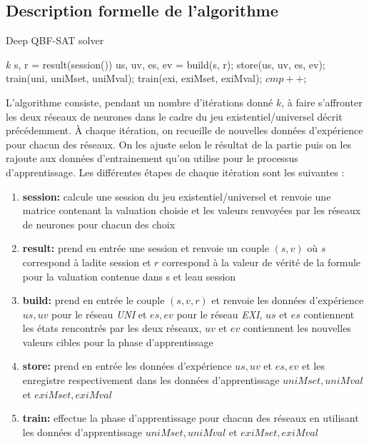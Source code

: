 \documentclass{article}
\begin{document}
\subsection{Description formelle de l'algorithme}
	\begin{algorithm}
	\caption{Deep QBF-SAT solver}
	\begin{algorithmic}
	\REQUIRE  $k$ 
	\STATE  s, r = result(session())
	\STATE  us, uv, es, ev = build(s, r);
	\STATE store(us, uv, es, ev);
	\STATE train(uni, uniMset, uniMval);
	\STATE train(exi, exiMset, exiMval);
	\STATE $cmp++$;
	\ENDWHILE
	\end{algorithmic}
	\end{algorithm}
	L'algorithme consiste, pendant un nombre d'itérations donné $k$, à faire s'affronter les deux réseaux de neurones dans le cadre du jeu existentiel/universel décrit précédemment. À chaque itération, on recueille de nouvelles données d'expérience pour chacun des réseaux. On les ajuste selon le résultat de la partie puis on les rajoute aux données d'entrainement qu'on utilise pour le processus d'apprentissage.
	Les différentes étapes de chaque itération sont les suivantes :
	\begin{enumerate}
	\item \textbf{session:} calcule une session du jeu existentiel/universel et renvoie une matrice contenant la valuation choisie et les valeurs renvoyées par les réseaux de neurones pour chacun des choix
	\item \textbf{result:} prend en entrée une session et renvoie un couple $(s,v)$ où $s$ correspond à ladite session et $r$ correspond à la valeur de vérité de la formule pour la valuation contenue dans s et leau session
	\item \textbf{build:} prend en entrée le couple $(s,v,r)$ et renvoie les données d'expérience $us,uv$ pour le réseau \textit{UNI} et $es,ev$ pour le réseau \textit{EXI}, $us$ et $es$ contiennent les états rencontrés par les deux réseaux, $uv$ et $ev$ contiennent les nouvelles valeurs cibles pour la phase d'apprentissage
	\item \textbf{store:} prend en entrée les données d'expérience $us,uv$ et $es,ev$ et les enregistre respectivement dans les données d'apprentissage $uniMset, uniMval$ et $exiMset, exiMval$  
	\item \textbf{train:} effectue la phase d'apprentissage pour chacun des réseaux en utilisant les données d'apprentissage $uniMset, uniMval$ et $exiMset, exiMval$ 
	\end{enumerate}	 
\newpage	
\end{document}
